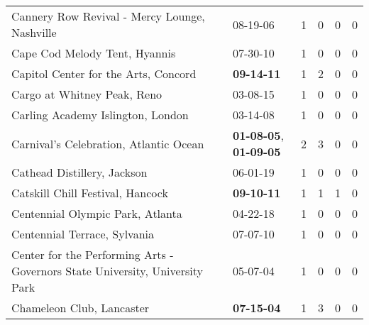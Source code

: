 \begin{longtable}{p{}p{}p{}p{}p{}p{}}
                                Cannery Row Revival - Mercy Lounge, Nashville &                                                08-19-06\textsuperscript{} &  1 &  0 &  0 &  0 \\
                                                Cape Cod Melody Tent, Hyannis &                                                07-30-10\textsuperscript{} &  1 &  0 &  0 &  0 \\
                                         Capitol Center for the Arts, Concord &                                       \textbf{09-14-11\textsuperscript{}} &  1 &  2 &  0 &  0 \\
                                                  Cargo at Whitney Peak, Reno &                                                03-08-15\textsuperscript{} &  1 &  0 &  0 &  0 \\
                                            Carling Academy Islington, London &                                                03-14-08\textsuperscript{} &  1 &  0 &  0 &  0 \\
                                       Carnival's Celebration, Atlantic Ocean &  \textbf{01-08-05\textsuperscript{}}, \textbf{01-09-05\textsuperscript{}} &  2 &  3 &  0 &  0 \\
                                                  Cathead Distillery, Jackson &                                                06-01-19\textsuperscript{} &  1 &  0 &  0 &  0 \\
                                             Catskill Chill Festival, Hancock &                                       \textbf{09-10-11\textsuperscript{}} &  1 &  1 &  1 &  0 \\
                                             Centennial Olympic Park, Atlanta &                                                04-22-18\textsuperscript{} &  1 &  0 &  0 &  0 \\
                                                 Centennial Terrace, Sylvania &                                                07-07-10\textsuperscript{} &  1 &  0 &  0 &  0 \\
 Center for the Performing Arts - Governors State University, University Park &                                                05-07-04\textsuperscript{} &  1 &  0 &  0 &  0 \\
                                                    Chameleon Club, Lancaster &                                       \textbf{07-15-04\textsuperscript{}} &  1 &  3 &  0 &  0 \\

\end{longtable}
